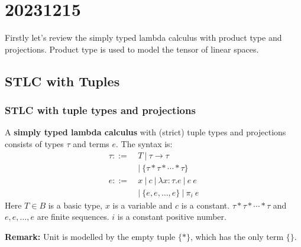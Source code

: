 \chapter{20231215}




Firstly let's review the simply typed lambda calculus with product type and projections. Product type is used to model the tensor of linear spaces.

\section{STLC with Tuples}

\subsection{STLC with tuple types and projections}

\begin{definition}
    A \textbf{simply typed lambda calculus} with (strict) tuple types and projections consists of types $\tau$ and terms $e$. The syntax is:
    \begin{align*}
        \tau ::=&\ T\ |\ \tau \to \tau\\
          &\ |\ \{ \tau * \tau * \cdots * \tau \} \\
        e ::=&\ x\ |\ c\ |\ \lambda x : \tau. e\ |\ e\ e\\
          &\ |\ \{ e, e, \dots, e \}\ |\ \pi_i\ e
    \end{align*}
    Here $T \in B$ is a basic type, $x$ is a variable and $c$ is a constant.
    $\tau * \tau * \cdots * \tau$ and $e, e, \dots, e$ are finite sequences. $i$ is a constant positive number.
\end{definition}

\textbf{Remark:} Unit is modelled by the empty tuple $\{*\}$, which has the only term $\{\}$.

